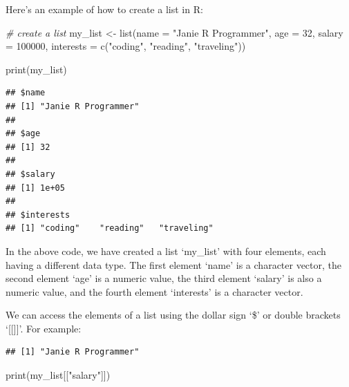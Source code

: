 \documentclass[
]{book}
\newenvironment{Shaded}{\begin{snugshade}}{\end{snugshade}}
\newcommand{\AttributeTok}[1]{\textcolor[rgb]{0.77,0.63,0.00}{#1}}
\newcommand{\CommentTok}[1]{\textcolor[rgb]{0.56,0.35,0.01}{\textit{#1}}}
\newcommand{\DecValTok}[1]{\textcolor[rgb]{0.00,0.00,0.81}{#1}}
\newcommand{\FunctionTok}[1]{\textcolor[rgb]{0.00,0.00,0.00}{#1}}
\newcommand{\NormalTok}[1]{#1}
\newcommand{\OtherTok}[1]{\textcolor[rgb]{0.56,0.35,0.01}{#1}}
\newcommand{\SpecialCharTok}[1]{\textcolor[rgb]{0.00,0.00,0.00}{#1}}
\newcommand{\StringTok}[1]{\textcolor[rgb]{0.31,0.60,0.02}{#1}}
\begin{document}
Here's an example of how to create a list in R:

\begin{Shaded}
\begin{Highlighting}[]
\CommentTok{\# create a list}
\NormalTok{my\_list }\OtherTok{\textless{}{-}} \FunctionTok{list}\NormalTok{(}\AttributeTok{name =} \StringTok{"Janie R Programmer"}\NormalTok{,}
                \AttributeTok{age =} \DecValTok{32}\NormalTok{,}
                \AttributeTok{salary =} \DecValTok{100000}\NormalTok{,}
                \AttributeTok{interests =} \FunctionTok{c}\NormalTok{(}\StringTok{"coding"}\NormalTok{, }\StringTok{"reading"}\NormalTok{, }\StringTok{"traveling"}\NormalTok{))}

\FunctionTok{print}\NormalTok{(my\_list)}
\end{Highlighting}
\end{Shaded}

\begin{verbatim}
## $name
## [1] "Janie R Programmer"
## 
## $age
## [1] 32
## 
## $salary
## [1] 1e+05
## 
## $interests
## [1] "coding"    "reading"   "traveling"
\end{verbatim}

In the above code, we have created a list `my\_list' with four elements, each having a different data type. The first element `name' is a character vector, the second element `age' is a numeric value, the third element `salary' is also a numeric value, and the fourth element `interests' is a character vector.

We can access the elements of a list using the dollar sign `\$' or double brackets `{[}{[}{]}{]}'. For example:

\begin{Shaded}
\end{Shaded}

\begin{verbatim}
## [1] "Janie R Programmer"
\end{verbatim}

\begin{Shaded}
\begin{Highlighting}[]
\FunctionTok{print}\NormalTok{(my\_list[[}\StringTok{"salary"}\NormalTok{]])}
\end{Highlighting}
\end{Shaded}
\end{document}
